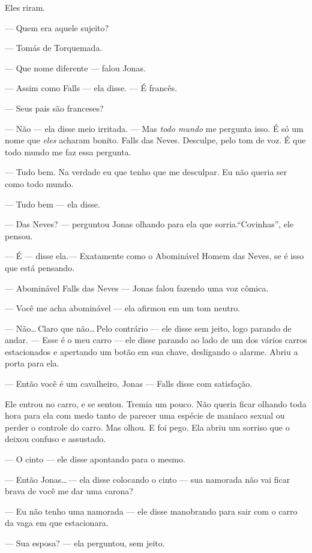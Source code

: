 Eles riram.

--- Quem era aquele sujeito?

--- Tomás de Torquemada.

--- Que nome diferente --- falou Jonas.

--- Assim como Falls --- ela disse. --- É francês.

--- Seus pais são franceses?

--- Não --- ela disse meio irritada. --- Mas \emph{todo mundo} me pergunta isso. É só um nome que \emph{eles} acharam bonito. Falls das Neves. Desculpe, pelo tom de voz. É que todo mundo me faz essa pergunta.

--- Tudo bem. Na verdade eu que tenho que me desculpar. Eu não queria ser como todo mundo.

--- Tudo bem --- ela disse.

--- Das Neves? --- perguntou Jonas olhando para ela\mudanca{,} que sorria.``Covinhas'', ele pensou.

--- É --- disse ela.--- Exatamente como o Abominável Homem das Neves, se é isso que está pensando.

--- Abominável Falls das Neves --- Jonas falou fazendo uma voz cômica.

--- Você me acha abominável --- ela afirmou em um tom neutro.

--- Não\ldots\,Claro que não\ldots\,Pelo contrário --- ele disse sem jeito, logo parando de andar. --- Esse é o meu carro --- ele disse parando ao lado de um dos vários carros estacionados e apertando um botão em sua chave, desligando o alarme. Abriu a porta para ela.

--- Então você é um cavalheiro, Jonas --- Falls disse\mudanca{,} com satisfação.

Ele entrou no carro, e se sentou. Tremia um pouco. Não queria ficar olhando toda hora para ela com medo tanto de parecer uma espécie de maníaco sexual ou perder o controle do carro. Mas olhou. E foi pego. Ela abriu um sorriso que o deixou confuso e assustado.

--- O cinto --- ele disse apontando para o mesmo.

--- Então Jonas\ldots\,--- ela disse colocando o cinto --- sua namorada não vai ficar brava de você me dar uma carona?

--- Eu não tenho uma namorada --- ele disse\mudanca{,} manobrando para sair com o carro da vaga em que estacionara.

--- Sua esposa? --- ela perguntou, sem jeito.

